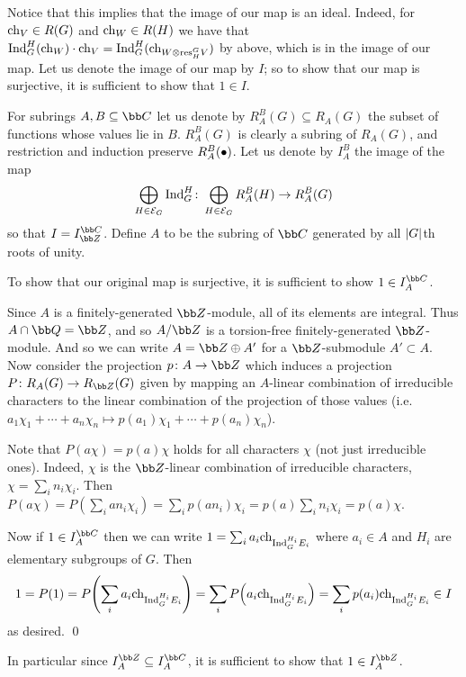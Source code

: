\eproof

Notice that this implies that the image of our map is an ideal.
Indeed, for ${\rm ch}_V\in R(G)$ and ${\rm ch}_W\in R(H)$ we have that ${\rm Ind}^H_G({\rm ch}_W)\cdot{\rm ch}_V={\rm Ind}^H_G({\rm ch}_{W\otimes{\rm res}^G_HV})$ by above, which is in the image of our map.
Let us denote the image of our map by $I$; so to show that our map is surjective, it is sufficient to show that $1\in I$.

For subrings $A,B\subseteq\bC$ let us denote by $R^B_A(G)\subseteq R_A(G)$ the subset of functions whose values lie in $B$.
$R^B_A(G)$ is clearly a subring of $R_A(G)$, and restriction and induction preserve $R^B_A(\bullet)$.
Let us denote by $I^B_A$ the image of the map
$$ \bigoplus_{H\in{\cal E}_G}{\rm Ind}^H_G\colon\bigoplus_{H\in{\cal E}_G}R^B_A(H)\to R^B_A(G) $$
so that $I=I^\bC_\bZ$.
Define $A$ to be the subring of $\bC$ generated by all $\mathopen{}\mathclose{\left|G\right|}$th roots of unity.

\blemm

    To show that our original map is surjective, it is sufficient to show $1\in I^\bC_A$.

\elemm

\bproof

    Since $A$ is a finitely-generated $\bZ$-module, all of its elements are integral.
    Thus $A\cap\bQ=\bZ$, and so $A/\bZ$ is a torsion-free finitely-generated $\bZ$-module.
    And so we can write $A=\bZ\oplus A'$ for a $\bZ$-submodule $A'\subset A$.
    Now consider the projection $p\colon A\to\bZ$ which induces a projection $P\colon R_A(G)\to R_\bZ(G)$ given by mapping an $A$-linear combination of irreducible characters to the
    linear combination of the projection of those values (i.e.\ $a_1\chi_1+\cdots+a_n\chi_n\mapsto p(a_1)\chi_1+\cdots+p(a_n)\chi_n$).

    Note that $P(a\chi)=p(a)\chi$ holds for all characters $\chi$ (not just irreducible ones).
    Indeed, $\chi$ is the $\bZ$-linear combination of irreducible characters, $\chi=\sum_in_i\chi_i$.
    Then $P(a\chi)=P(\sum_ian_i\chi_i)=\sum_ip(an_i)\chi_i=p(a)\sum_in_i\chi_i=p(a)\chi$.

    Now if $1\in I^\bC_A$ then we can write $1=\sum_ia_i{\rm ch}_{{\rm Ind}^{H_i}_GE_i}$ where $a_i\in A$ and $H_i$ are elementary subgroups of $G$.
    Then
    $$ 1 = P(1) = P\mathopen{}\mathclose{\left(\sum_ia_i{\rm ch}_{{\rm Ind}^{H_i}_GE_i}\right)} = \sum_iP\mathopen{}\mathclose{\left(a_i{\rm ch}_{{\rm Ind}^{H_i}_GE_i}\right)} = \sum_ip(a_i){\rm ch}_{{\rm Ind}^{H_i}_GE_i} \in I $$
    as desired.
    \qed

\eproof

In particular since $I^\bZ_A\subseteq I^\bC_A$, it is sufficient to show that $1\in I^\bZ_A$.

